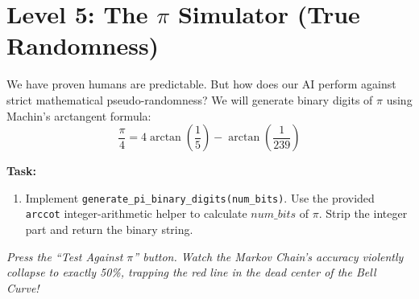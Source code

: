 \documentclass[12pt]{article}
\begin{document}
\section{Level 5: The $\pi$ Simulator (True Randomness)}
We have proven humans are predictable. But how does our AI perform against strict mathematical pseudo-randomness?
We will generate binary digits of $\pi$ using Machin's arctangent formula:
$$ \frac{\pi}{4} = 4 \arctan\left(\frac{1}{5}\right) - \arctan\left(\frac{1}{239}\right) $$

\textbf{Task:}
\begin{enumerate}
    \item Implement \texttt{generate\_pi\_binary\_digits(num\_bits)}. Use the provided \texttt{arccot} integer-arithmetic helper to calculate $num\_bits$ of $\pi$. Strip the integer part and return the binary string.
\end{enumerate}
\textit{Press the ``Test Against $\pi$'' button. Watch the Markov Chain's accuracy violently collapse to exactly 50\%, trapping the red line in the dead center of the Bell Curve!}
\end{document}
